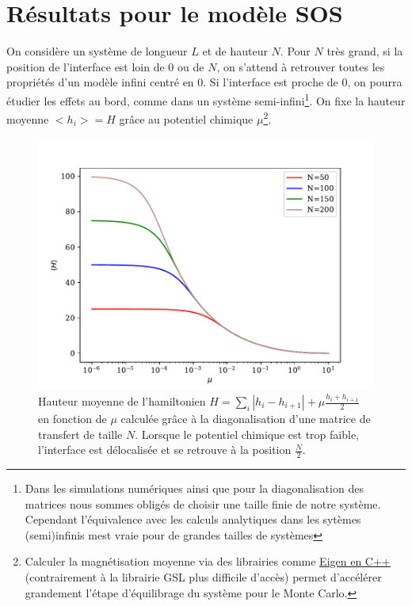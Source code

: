 \chapter{Résultats pour le modèle SOS}
    \label{chap-sos}

On considère un système de longueur $L$ et de hauteur $N$. Pour $N$ très grand, si la position de l'interface est loin de $0$ ou de $N$, on s'attend à retrouver toutes les propriétés d'un modèle infini centré en 0. Si l'interface est proche de $0$, on pourra étudier les effets au bord, comme dans un système semi-infini\footnote{Dans les simulations numériques ainsi que pour la diagonalisation des matrices nous sommes obligés de choisir une taille finie de notre système. Cependant l'équivalence avec les calculs analytiques dans les sytèmes (semi)infinis mest vraie pour de grandes tailles de systèmes}.  On fixe la hauteur moyenne $<h_i> = H$ grâce au potentiel chimique $\mu$\footnote{Calculer la magnétisation moyenne via des librairies comme \hyperlink{http://eigen.tuxfamily.org/index.php?title=Main_Page}{\underline{Eigen en C++}} (contrairement à la librairie GSL plus difficile d'accès) permet d'accélérer grandement l'étape d'équilibrage du système pour le Monte Carlo.}.

\begin{figure}[h]
	\includegraphics[width=\linewidth]{semiifgeom/hauteur-mu.pdf}
	\caption{Hauteur moyenne de l'hamiltonien $H = \sum_i |h_i-h_{i+1}| + \mu \frac{h_i+h_{i+1}}{2}$ en fonction de $\mu$ calculée grâce à la diagonalisation d'une matrice de transfert de taille $N$. Lorsque le potentiel chimique est trop faible, l'interface est délocalisée et se retrouve à la position $\frac{N}{2}$. }
	\label{hauteur-mu}
\end{figure}

